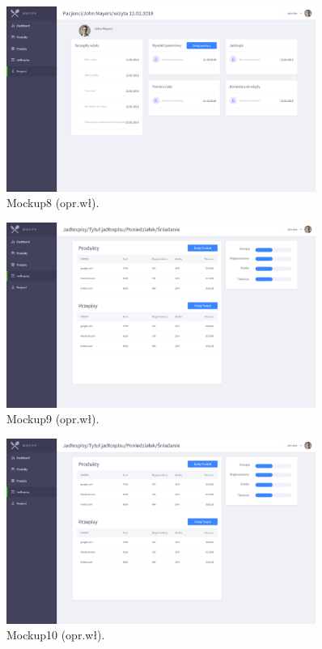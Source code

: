 \begin{minipage}{\textwidth}
    \begin{figure}[H]
        \centering\includegraphics[width=0.9\textwidth]{img/mockups/mockup8.png}
        \caption{Mockup8 (opr.wł).}\label{rysunek:mockup8}
    \end{figure}
\end{minipage}

\begin{minipage}{\textwidth}
    \begin{figure}[H]
        \centering\includegraphics[width=0.9\textwidth]{img/mockups/mockup9.png}
        \caption{Mockup9 (opr.wł).}\label{rysunek:mockup9}
    \end{figure}
\end{minipage}

\begin{minipage}{\textwidth}
    \begin{figure}[H]
        \centering\includegraphics[width=0.9\textwidth]{img/mockups/mockup10.png}
        \caption{Mockup10 (opr.wł).}\label{rysunek:mockup10}
    \end{figure}
\end{minipage}

